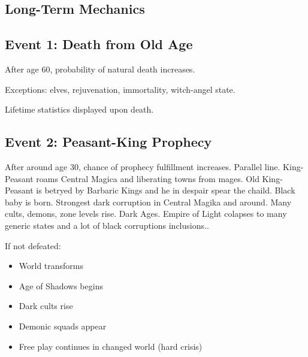 \subsection{Long-Term Mechanics}

\subsection{Event 1: Death from Old Age}

After age 60, probability of natural death increases.

Exceptions: elves, rejuvenation, immortality, witch-angel state.

Lifetime statistics displayed upon death.



\subsection{Event 2: Peasant-King Prophecy}

After around age 30, chance of prophecy fulfillment increases.
Parallel line. King-Peasant roams Central Magica and liberating towns from mages. Old King-Peasant is betryed by Barbaric Kings and he in despair spear the chaild. Black baby is born. Strongest dark corruption in Central Magika and around. Many cults, demons, zone levels rise. Dark Ages. Empire of Light colapses to many generic states and a lot of black corruptions inclusions..

If not defeated:

\begin{itemize}
\item World transforms
\item Age of Shadows begins
\item Dark cults rise
\item Demonic squads appear
\item Free play continues in changed world (hard crisis)
\end{itemize}